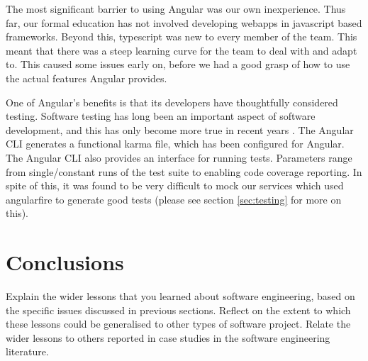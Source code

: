\documentclass{l3proj}
\begin{document}
The most significant barrier to using Angular was our own inexperience. 
 Thus far, our formal education has not involved developing webapps in
 javascript based frameworks. Beyond this, typescript was new to every
 member of the team. This meant that there was a steep learning curve for
 the team to deal with and adapt to. This caused some issues early on, 
 before we had a good grasp of how to use the actual features Angular
 provides.
 
One of Angular's benefits is that its developers have thoughtfully
 considered testing. Software testing has long been an important
 aspect of software development, and this has only become more true
 in recent years \cite{tuteja2012testing}. The Angular CLI generates
 a functional karma file, which has been configured for Angular. The
 Angular CLI also provides an interface for running tests. Parameters 
 range from single/constant runs of the test suite to enabling code
 coverage reporting. In spite of this, it was found to be very 
 difficult to mock our services which used angularfire to generate
 good tests (please see section \ref{sec:testing} for more on this).
 



\section{Conclusions}
\label{sec:conclusion}


Explain the wider lessons that you learned about software engineering,
based on the specific issues discussed in previous sections.  Reflect
on the extent to which these lessons could be generalised to other
types of software project.  Relate the wider lessons to others
reported in case studies in the software engineering literature.



\end{document}
